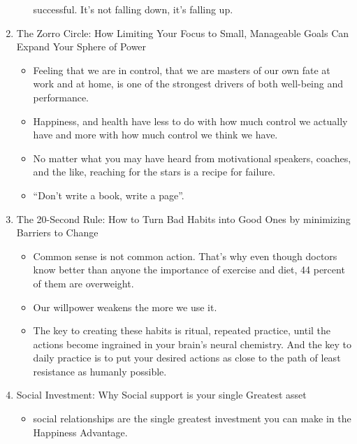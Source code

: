 \documentclass[12pt]{article}
\begin{document}
\begin{enumerate}
\begin{itemize}
  successful. It’s not falling down, it’s falling up.
\end{itemize}
\item The Zorro Circle: How Limiting Your Focus to Small, Manageable
  Goals Can Expand Your Sphere of Power
\begin{itemize}
\item Feeling that we are in control, that we are masters of our own
  fate at work and at home, is one of the strongest drivers of both
  well-being and performance.
\item Happiness, and health have less to do with how much control we
  actually have and more with how much control we think we have.
\item No matter what you may have heard from motivational speakers,
  coaches, and the like, reaching for the stars is a recipe for
  failure.
\item ``Don’t write a book, write a page''.
\end{itemize}
\item The 20-Second Rule: How to Turn Bad Habits into Good Ones by
  minimizing Barriers to Change
\begin{itemize}
\item Common sense is not common action. That’s why even though doctors know better than anyone the importance of exercise and diet, 44 percent of them are overweight.
\item Our willpower weakens the more we use it.
\item The key to creating these habits is ritual, repeated practice,
  until the actions become ingrained in your brain’s neural
  chemistry. And the key to daily practice is to put your desired
  actions as close to the path of least resistance as humanly
  possible.
 \end{itemize}
\item  Social Investment: Why Social support is your single Greatest
  asset
\begin{itemize}
\item social relationships are the single greatest investment you can
  make in the Happiness Advantage.
\end{itemize}
\end{enumerate}
\end{document}
